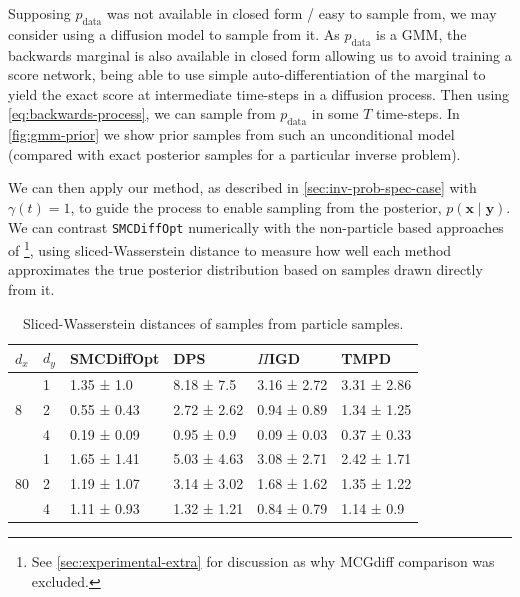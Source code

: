 Supposing $p_{\text{data}}$ was not available in closed form / easy to sample from, we may consider
using a diffusion model to sample from it. As $p_{\text{data}}$ is a GMM, the backwards marginal is
also available in closed form allowing us to avoid training a score network, being able to use
simple auto-differentiation of the marginal to yield the exact score at intermediate time-steps in a
diffusion process. Then using \autoref{eq:backwards-process}, we can sample from $p_{\text{data}}$
in some $T$ time-steps. In \autoref{fig:gmm-prior} we show prior samples from such an
unconditional model (compared with exact posterior samples for a particular inverse problem).

We can then apply our method, as described in \autoref{sec:inv-prob-spec-case}
with $\gamma(t) = 1$, to guide the process to enable sampling from the posterior,
$p(\mathbf{x} \mid \mathbf{y})$. We can contrast \texttt{SMCDiffOpt} numerically with the
non-particle based approaches of
\textcite{song2023pseudoinverseguided,boysTweedieMomentProjected2023,chungDiffusionPosteriorSampling2022}
\footnote{See \autoref{sec:experimental-extra} for discussion as why MCGdiff comparison was excluded.},
using sliced-Wasserstein distance \parencite{boysTweedieMomentProjected2023,cardosoMonteCarloGuided2023}
to measure how well each method approximates the true posterior distribution based on samples
drawn directly from it.

\begin{table}[t]
    \centering
    \begin{tabular}{llllll}
        \toprule
        $d_x$ & $d_y$ & SMCDiffOpt & DPS & $\Pi$IGD & TMPD \\
        \midrule
        \multirow[t]{3}{*}{8} & 1 & 1.35 ± 1.0 & 8.18 ± 7.5 & 3.16 ± 2.72 & 3.31 ± 2.86 \\
         & 2 & 0.55 ± 0.43 & 2.72 ± 2.62 & 0.94 ± 0.89 & 1.34 ± 1.25 \\
         & 4 & 0.19 ± 0.09 & 0.95 ± 0.9 & 0.09 ± 0.03 & 0.37 ± 0.33 \\
        \cline{1-6}
        \multirow[t]{3}{*}{80} & 1 & 1.65 ± 1.41 & 5.03 ± 4.63 & 3.08 ± 2.71 & 2.42 ± 1.71 \\
         & 2 & 1.19 ± 1.07 & 3.14 ± 3.02 & 1.68 ± 1.62 & 1.35 ± 1.22 \\
         & 4 & 1.11 ± 0.93 & 1.32 ± 1.21 & 0.84 ± 0.79 & 1.14 ± 0.9 \\
        \cline{1-6}
        \bottomrule
    \end{tabular}
    \caption{Sliced-Wasserstein distances of samples from particle samples.}
    \label{tab:gmm}
\end{table}

